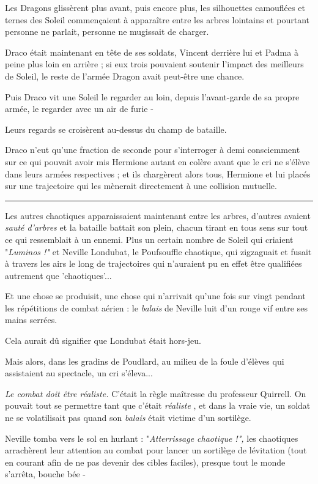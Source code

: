 Les Dragons glissèrent plus avant, puis encore plus, les silhouettes camouflées et ternes des Soleil commençaient à apparaître entre les arbres lointains et pourtant personne ne parlait, personne ne mugissait de charger.

Draco était maintenant en tête de ses soldats, Vincent derrière lui et Padma à peine plus loin en arrière ; si eux trois pouvaient soutenir l'impact des meilleurs de Soleil, le reste de l'armée Dragon avait peut-être une chance.

Puis Draco vit une Soleil le regarder au loin, depuis l'avant-garde de sa propre armée, le regarder avec un air de furie -

Leurs regards se croisèrent au-dessus du champ de bataille.

Draco n'eut qu'une fraction de seconde pour s'interroger à demi consciemment sur ce qui pouvait avoir mis Hermione autant en colère avant que le cri ne s'élève dans leurs armées respectives ; et ils chargèrent alors tous, Hermione et lui placés sur une trajectoire qui les mènerait directement à une collision mutuelle.
\par\noindent\rule{\textwidth}{0.4pt}
Les autres chaotiques apparaissaient maintenant entre les arbres, d'autres avaient \emph{sauté d'arbres}  et la bataille battait son plein, chacun tirant en tous sens sur tout ce qui ressemblait à un ennemi. Plus un certain nombre de Soleil qui criaient "\emph{Luminos !"}  et Neville Londubat, le Poufsouffle chaotique, qui zigzaguait et fusait à travers les airs le long de trajectoires qui n'auraient pu en effet être qualifiées autrement que 'chaotiques'...

Et une chose se produisit, une chose qui n'arrivait qu'une fois sur vingt pendant les répétitions de combat aérien : le \emph{balais}  de Neville luit d'un rouge vif entre ses mains serrées.

Cela aurait dû signifier que Londubat était hors-jeu.

Mais alors, dans les gradins de Poudlard, au milieu de la foule d'élèves qui assistaient au spectacle, un cri s'éleva...

\emph{Le combat doit être réaliste.}  C'était la règle maîtresse du professeur Quirrell. On pouvait tout se permettre tant que c'était \emph{réaliste} , et dans la vraie vie, un soldat ne se volatilisait pas quand son \emph{balais}  était victime d'un sortilège.

Neville tomba vers le sol en hurlant : "\emph{Atterrissage chaotique !",}  les chaotiques arrachèrent leur attention au combat pour lancer un sortilège de lévitation (tout en courant afin de ne pas devenir des cibles faciles), presque tout le monde s'arrêta, bouche bée -

